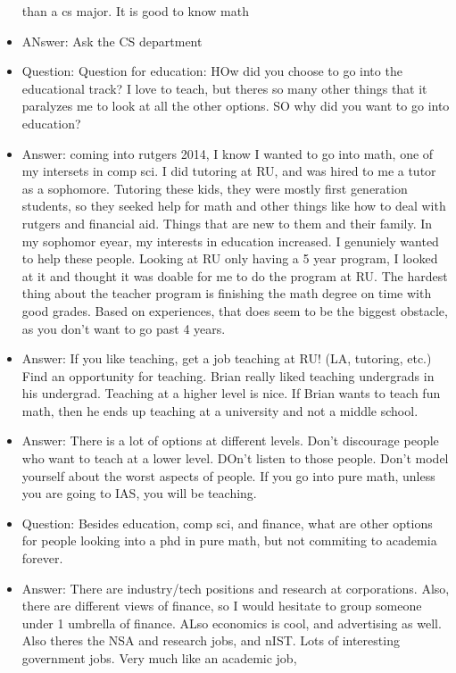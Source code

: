 \documentclass[10pt]{article}
\theoremstyle{definition}
\begin{document}
\begin{itemize}
    than a cs major. It is good to know math
  \item ANswer: Ask the CS department
  \item Question: Question for education: HOw did you choose to go
    into the educational track? I love to teach, but theres so
    many other things that it paralyzes me to look at all the
    other options. SO why did you want to go into education?
  \item Answer: coming into rutgers 2014, I know I wanted to go
    into math, one of my intersets in comp sci. I did tutoring at
    RU, and was hired to me a tutor as a sophomore. Tutoring these
    kids, they were mostly first generation students, so they
    seeked help for math and other things like how to deal with
    rutgers and financial aid. Things that are new to them and
    their family. In my sophomor eyear, my interests in education
    increased. I genuniely wanted to help these people. Looking at
    RU only having a 5 year program, I looked at it and thought it
    was doable for me to do the program at RU. The hardest thing
    about the teacher program is finishing the math degree on time
    with good grades. Based on experiences, that does seem to be
    the biggest obstacle, as you don't want to go past 4 years.
  \item Answer: If you like teaching, get a job teaching at RU!
    (LA, tutoring, etc.) Find an opportunity for teaching. Brian
    really liked teaching undergrads in his undergrad. Teaching at
    a higher level is nice. If Brian wants to teach fun math, then
    he ends up teaching at a university and not a middle
    school. 
  \item Answer: There is a lot of options at different
    levels. Don't discourage people who want to teach at a lower
    level. DOn't listen to those people. Don't model yourself
    about the worst aspects of people. If you go into pure math,
    unless you are going to IAS, you will be teaching. 
  \item Question: Besides education, comp sci, and finance, what
    are other options for people looking into a phd in pure math,
    but not commiting to academia forever.
  \item Answer: There are industry/tech positions and research at
    corporations. Also, there are different views of finance, so I
    would hesitate to group someone under 1 umbrella of
    finance. ALso economics is cool, and advertising as well. Also
    theres the NSA and research jobs, and nIST. Lots of
    interesting government jobs. Very much like an academic job,

\end{itemize}
\end{document}
